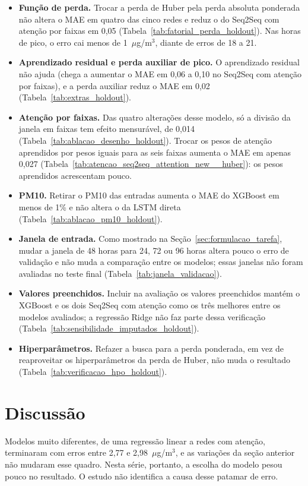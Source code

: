 \begin{itemize}
    \item \textbf{Função de perda.} Trocar a perda de Huber pela perda absoluta ponderada não altera o MAE em quatro das cinco redes e reduz o do Seq2Seq com atenção por faixas em 0,05 (Tabela~\ref{tab:fatorial_perda_holdout}). Nas horas de pico, o erro cai menos de 1~\(\mu\)g/m\(^3\), diante de erros de 18 a 21.
    \item \textbf{Aprendizado residual e perda auxiliar de pico.} O aprendizado residual não ajuda (chega a aumentar o MAE em 0,06 a 0,10 no Seq2Seq com atenção por faixas), e a perda auxiliar reduz o MAE em 0,02 (Tabela~\ref{tab:extras_holdout}).
    \item \textbf{Atenção por faixas.} Das quatro alterações desse modelo, só a divisão da janela em faixas tem efeito mensurável, de 0,014 (Tabela~\ref{tab:ablacao_desenho_holdout}). Trocar os pesos de atenção aprendidos por pesos iguais para as seis faixas aumenta o MAE em apenas 0,027 (Tabela~\ref{tab:atencao_seq2seq_attention_new__huber}): os pesos aprendidos acrescentam pouco.
    \item \textbf{PM10.} Retirar o PM10 das entradas aumenta o MAE do XGBoost em menos de 1\% e não altera o da LSTM direta (Tabela~\ref{tab:ablacao_pm10_holdout}).
    \item \textbf{Janela de entrada.} Como mostrado na Seção~\ref{sec:formulacao_tarefa}, mudar a janela de 48 horas para 24, 72 ou 96 horas altera pouco o erro de validação e não muda a comparação entre os modelos; essas janelas não foram avaliadas no teste final (Tabela~\ref{tab:janela_validacao}).
    \item \textbf{Valores preenchidos.} Incluir na avaliação os valores preenchidos mantém o XGBoost e os dois Seq2Seq com atenção como os três melhores entre os modelos avaliados; a regressão Ridge não faz parte dessa verificação (Tabela~\ref{tab:sensibilidade_imputados_holdout}).
    \item \textbf{Hiperparâmetros.} Refazer a busca para a perda ponderada, em vez de reaproveitar os hiperparâmetros da perda de Huber, não muda o resultado (Tabela~\ref{tab:verificacao_hpo_holdout}).
\end{itemize}

\section{Discussão}
\label{sec:limites}

Modelos muito diferentes, de uma regressão linear a redes com atenção, terminaram com erros entre 2,77 e 2,98~\(\mu\)g/m\(^3\), e as variações da seção anterior não mudaram esse quadro. Nesta série, portanto, a escolha do modelo pesou pouco no resultado. O estudo não identifica a causa desse patamar de erro.

